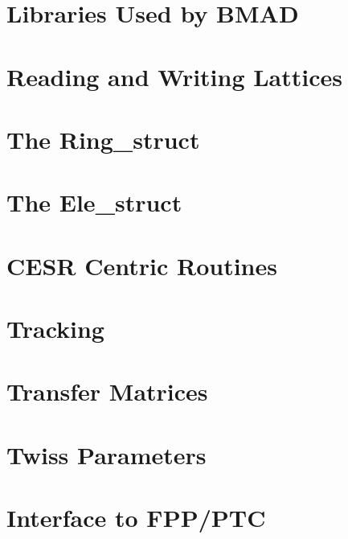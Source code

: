 \documentclass{book}
\begin{document}
\chapter{Libraries Used by BMAD}

\chapter{Reading and Writing Lattices}

\chapter{The Ring\_struct}

\chapter{The Ele\_struct}

\chapter{CESR Centric Routines}

\chapter{Tracking}

\chapter{Transfer Matrices}

\chapter{Twiss Parameters}

\chapter{Interface to FPP/PTC}
\end{document}
